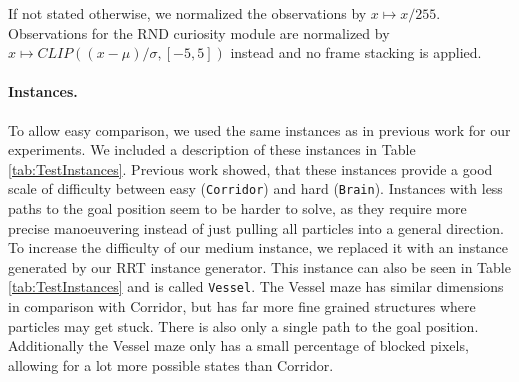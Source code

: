 If not stated otherwise, we normalized the observations by $x \mapsto x/255$. Observations for the RND curiosity module are normalized by $x \mapsto CLIP((x-\mu)/\sigma, [-5, 5])$ instead and no frame stacking is applied.


\paragraph{Instances.}
To allow easy comparison, we used the same instances as in previous work for our experiments. We included a description of these instances in Table \ref{tab:TestInstances}. Previous work showed, that these instances provide a good scale of difficulty between easy (\texttt{Corridor}) and hard (\texttt{Brain}). Instances with less paths to the goal position seem to be harder to solve, as they require more precise manoeuvering instead of just pulling all particles into a general direction. To increase the difficulty of our medium instance, we replaced it with an instance generated by our RRT instance generator. This instance can also be seen in Table \ref{tab:TestInstances} and is called \texttt{Vessel}. The Vessel maze has similar dimensions in comparison with Corridor, but has far more fine grained structures where particles may get stuck. There is also only a single path to the goal position. Additionally the Vessel maze only has a small percentage of blocked pixels, allowing for a lot more possible states than Corridor. 

